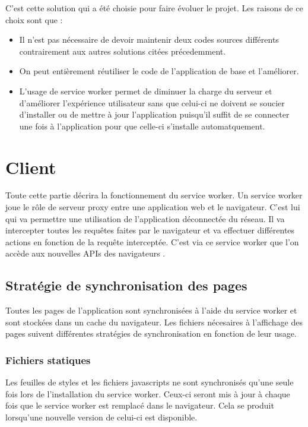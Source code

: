 \documentclass{EPL-master-thesis-covers-FR}
\begin{document}
				C'est cette solution qui a été choisie pour faire évoluer le projet. Les raisons de ce choix sont que :
				\begin{itemize}
					\item Il n'est pas nécessaire de devoir maintenir deux codes sources différents contrairement aux autres solutions citées précedemment.
					\item On peut entièrement réutiliser le code de l'application de base et l'améliorer.
					\item L'usage de service worker permet de diminuer la charge du serveur et d'améliorer l'expérience utilisateur sans que celui-ci ne doivent se soucier d'installer ou de mettre à jour l'application puisqu'il suffit de se connecter une fois à l'application pour que celle-ci s'installe automatquement.
				\end{itemize}
				
				
		\section{Client}
			Toute cette partie décrira la fonctionnement du service worker. Un service worker joue le rôle de serveur proxy entre une application web et le navigateur. C'est lui qui va permettre une utilisation de l'application déconnectée du réseau. Il va intercepter toutes les requêtes faites par le navigateur et va effectuer différentes actions en fonction de la requête interceptée. C'est via ce service worker que l'on accède aux nouvelles APIs des navigateurs \cite{ref:sw}.
			
			
			\subsection{Stratégie de synchronisation des pages}			
				Toutes les pages de l'application sont synchronisées à l'aide du service worker et sont stockées dans un cache du navigateur. Les fichiers nécesaires à l'affichage des pages suivent différentes stratégies de synchronisation en fonction de leur usage.			
				
				\subsubsection*{Fichiers statiques}  
					Les feuilles de styles et les fichiers javascripts ne sont synchronisés qu'une seule fois lors de l'installation du service worker. Ceux-ci seront mis à jour à chaque fois que le service worker est remplacé dans le navigateur. Cela se produit lorsqu'une nouvelle version de celui-ci est disponible. 
					
\end{document}
